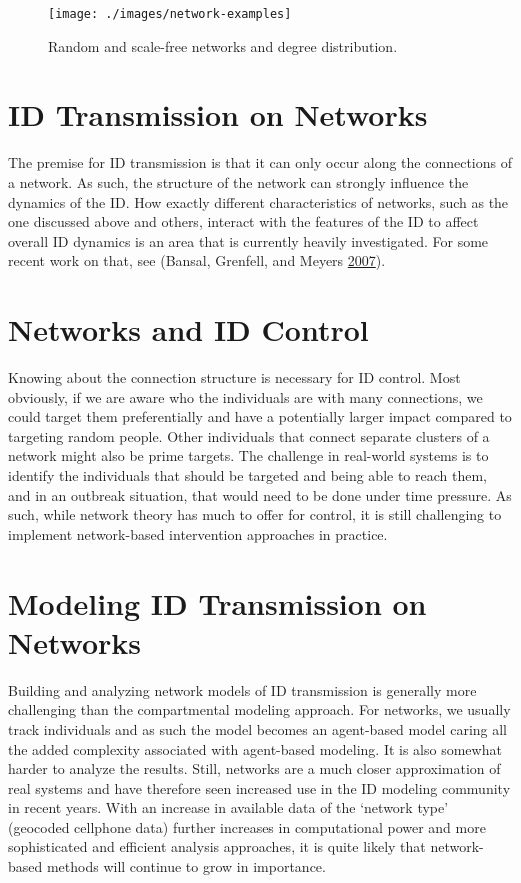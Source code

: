 \documentclass[
]{book}
\begin{document}
\begin{figure}
\texttt{[image: ./images/network-examples]} \caption{Random and scale-free networks and degree distribution.}\label{fig:network-examples}
\end{figure}

\hypertarget{id-transmission-on-networks}{%
\section{ID Transmission on Networks}\label{id-transmission-on-networks}}

The premise for ID transmission is that it can only occur along the connections of a network. As such, the structure of the network can strongly influence the dynamics of the ID. How exactly different characteristics of networks, such as the one discussed above and others, interact with the features of the ID to affect overall ID dynamics is an area that is currently heavily investigated. For some recent work on that, see (Bansal, Grenfell, and Meyers \protect\hyperlink{ref-bansal07}{2007}).

\hypertarget{networks-and-id-control}{%
\section{Networks and ID Control}\label{networks-and-id-control}}

Knowing about the connection structure is necessary for ID control. Most obviously, if we are aware who the individuals are with many connections, we could target them preferentially and have a potentially larger impact compared to targeting random people. Other individuals that connect separate clusters of a network might also be prime targets. The challenge in real-world systems is to identify the individuals that should be targeted and being able to reach them, and in an outbreak situation, that would need to be done under time pressure. As such, while network theory has much to offer for control, it is still challenging to implement network-based intervention approaches in practice.

\hypertarget{modeling-id-transmission-on-networks}{%
\section{Modeling ID Transmission on Networks}\label{modeling-id-transmission-on-networks}}

Building and analyzing network models of ID transmission is generally more challenging than the compartmental modeling approach. For networks, we usually track individuals and as such the model becomes an agent-based model caring all the added complexity associated with agent-based modeling. It is also somewhat harder to analyze the results. Still, networks are a much closer approximation of real systems and have therefore seen increased use in the ID modeling community in recent years. With an increase in available data of the `network type' (geocoded cellphone data) further increases in computational power and more sophisticated and efficient analysis approaches, it is quite likely that network-based methods will continue to grow in importance.
\end{document}
